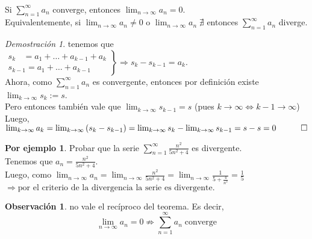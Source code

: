 \documentclass{article}
\theoremstyle{definition}
\newtheorem*{obs}{Observación}
\newtheorem*{ej}{Por ejemplo}
\theoremstyle{remark}
\newtheorem*{demo}{Demostración}
\begin{document}
\begin{teo} \; \\
  Si $\sum_{n=1}^{\infty}{a_n}$ converge, entonces $\lim_{n \to \infty}{a_n}=0$. \\ 
  Equivalentemente, si $\lim_{n \to \infty}{a_n} \neq 0$ o $\lim_{n \to \infty}{a_n} \; \nexists$ entonces $\sum_{n=1}^{\infty}{a_n}$ diverge.
\end{teo}
\pagebreak
\begin{demo} tenemos que \\
$\left.\begin{array}{l}
  s_{k\phantom{-1}}=a_1+\dots+a_{k-1}+a_k \\
  s_{k-1}=a_1+\dots+a_{k-1}
\end{array}\right\} \Rightarrow s_k-s_{k-1}=a_k.$\\
Ahora, como $\sum_{n=1}^{\infty}{a_n}$ es convergente, entonces por definición existe $\lim_{k \to \infty}{s_k}:=s$. \\
Pero entonces también vale que $\lim_{k \to \infty}{s_{k-1}}=s$ \quad \big(pues $k\to\infty \Leftrightarrow k-1 \to \infty $\big)\\
Luego, $\lim_{k\to\infty}{a_k} = \lim_{k\to\infty}{\left(s_k-s_{k-1}\right)}=\lim_{k\to\infty}{s_k} - \lim_{k\to\infty}{s_{k-1}}=s-s=0 \quad \qed $
\end{demo}
\begin{ej}
  Probar que la serie $\sum_{n=1}^{\infty}{\frac{n^2}{5n^2+4}}$ es divergente. \\
  Tenemos que $a_n=\frac{n^2}{5n^2+4}.$ \\
  Luego, como $\lim_{n\to\infty}{a_n}=\lim_{n\to\infty}{\frac{n^2}{5n^2+4}}=\lim_{n\to\infty}{\frac{1}{5+\frac{4}{n^2}}}=\frac{1}{5}$ \\
  $\Rightarrow \; \text{por el criterio de la divergencia la serie es divergente.}$
\end{ej}
\begin{obs}
  no vale el recíproco del teorema. Es decir, \\
  $$\lim_{n\to\infty}{a_n=0}\not\Rightarrow \sum_{n=1}^{\infty}{a_n} \; \text{converge}$$
\end{obs}
\end{document}
